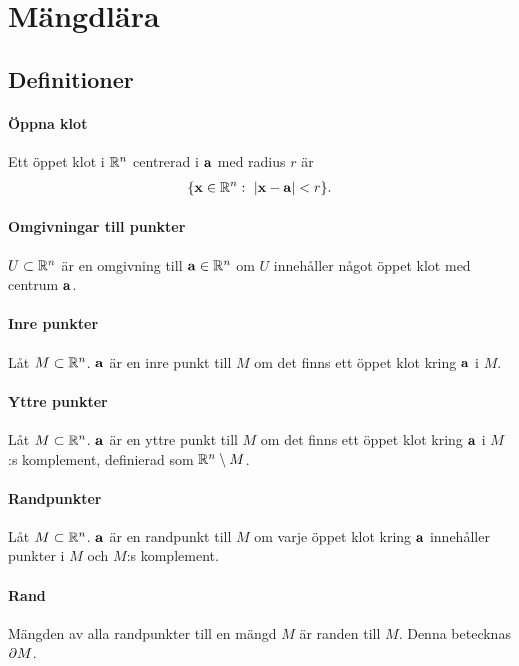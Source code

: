 \section{Mängdlära}

\subsection{Definitioner}

\paragraph{Öppna klot}
Ett öppet klot i $\mathbb{R}^n$ centrerad i $\vect{a}$ med radius $r$ är
\begin{align*}
	\{\vect{x}\in\R^n:\ \abs{\vect{x} - \vect{a}}<r\}.
\end{align*}

\paragraph{Omgivningar till punkter}
$U\subset\mathbb{R}^n$ är en omgivning till $\vect{a}\in\R^n$ om $U$ innehåller något öppet klot med centrum $\vect{a}$.

\paragraph{Inre punkter}
Låt $M\subset\mathbb{R}^n$. $\vect{a}$ är en inre punkt till $M$ om det finns ett öppet klot kring $\vect{a}$ i $M$.

\paragraph{Yttre punkter}
Låt $M\subset\mathbb{R}^n$. $\vect{a}$ är en yttre punkt till $M$ om det finns ett öppet klot kring $\vect{a}$ i $M$:s komplement, definierad som $\mathbb{R}^n\setminus M$.

\paragraph{Randpunkter}
Låt $M\subset\mathbb{R}^n$. $\vect{a}$ är en randpunkt till $M$ om varje öppet klot kring $\vect{a}$ innehåller punkter i $M$ och $M$:s komplement.

\paragraph{Rand}
Mängden av alla randpunkter till en mängd $M$ är randen till $M$. Denna betecknas $\partial M$.

